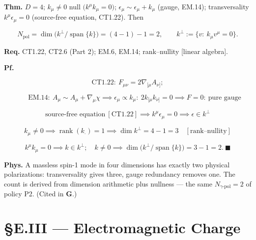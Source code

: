 \begin{theorem}\label{tag:EM-8}
\textbf{Thm.} $D=4$; $k_\mu\ne0$ null $\bigl(k^\mu k_\mu=0\bigr)$; $\epsilon_\mu\sim\epsilon_\mu+k_\mu$ (gauge, EM.14); transversality $k^\mu\epsilon_\mu=0$ (source-free equation, CT1.22). Then

\[
N_{\mathrm{pol}}=\dim\bigl(k^\perp/\operatorname{span}\{k\}\bigr)=(4-1)-1=2,\qquad
k^\perp:=\{v:\ k_\mu v^\mu=0\}.
\]

\textbf{Req.} CT1.22, CT2.6 (Part 2); EM.6, EM.14; rank–nullity [linear algebra].

\textbf{Pf.}

\[
\mathrm{CT1.22}:\ F_{\mu\nu}=2\nabla_{[\mu}A_{\nu]};
\]

\[
\qquad \mathrm{EM.14}:\ A_\mu\sim A_\mu+\nabla_\mu\chi\implies\epsilon_\mu\propto k_\mu:\ 2k_{[\mu}k_{\nu]}=0\implies F=0:\ \text{pure gauge}
\]

\[
\text{source-free equation}\ [\mathrm{CT1.22}]\implies k^\mu\epsilon_\mu=0\implies\epsilon\in k^\perp
\]

\[
k_\mu\ne0\implies\operatorname{rank}(k_\cdot)=1\implies\dim k^\perp=4-1=3\quad[\text{rank--nullity}]
\]

\[
k^\mu k_\mu=0\implies k\in k^\perp;\quad k\ne0\implies\dim\bigl(k^\perp/\operatorname{span}\{k\}\bigr)=3-1=2.\ \blacksquare
\]

\textbf{Phys.} A massless spin-1 mode in four dimensions has exactly two physical polarizations: transversality gives three, gauge redundancy removes one. The count is derived from dimension arithmetic plus nullness — the same $N_{\gamma\text{-pol}}=2$ of policy P2. (Cited in \textbf{G}.)

\end{theorem}

\section[§E.III — Electromagnetic Charge]{\texorpdfstring{§E.III — Electromagnetic Charge}{SE.III - Electromagnetic Charge}}


